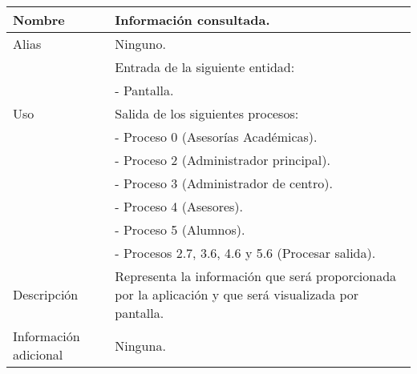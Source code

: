 \begin{center}
  \begin{tabular}{| l | p{9cm} |}
    \hline
    Nombre & \textbf{Información consultada}.\\
    \hline
    Alias & Ninguno.\\
    \hline
    \multirow{5}{*}{Uso} & Entrada de la siguiente entidad:\\
                         & - Pantalla.\\
                         & Salida de los siguientes procesos:\\
                         & - Proceso 0 (Asesorías Académicas).\\
                         & - Proceso 2 (Administrador principal).\\
                         & - Proceso 3 (Administrador de centro).\\
                         & - Proceso 4 (Asesores).\\
                         & - Proceso 5 (Alumnos).\\
                         & - Procesos 2.7, 3.6, 4.6 y 5.6 (Procesar salida).\\
    \hline
    Descripción & Representa la información que será proporcionada por la
                  aplicación y que será visualizada por pantalla.\\
    \hline
    Información adicional & Ninguna.\\
    \hline
  \end{tabular}
\end{center}
